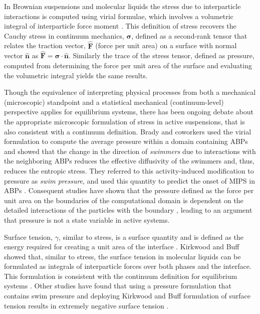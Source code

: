\documentclass[twoside,twocolumn,9pt]{article}
\begin{document}
In Brownian suspensions and molecular liquids
the stress due to interparticle interactions is computed using virial formulae, which involves a volumetric integral of interparticle force moment \cite{Kirkwood1946, Irving1950}. 
This definition of stress recovers 
the Cauchy stress in continuum mechanics,
$\mathbf{\sigma}$, defined 
as a second-rank tensor that relates the 
traction vector, $\hat{\mathbf{F}}$ (force per unit area) on a surface 
with normal vector $\hat{\mathbf{n}}$ as
$\hat{\mathbf{F}}=\mathbf{\sigma}\cdot \hat{\mathbf{n}}$. Similarly the trace of the stress
tensor, defined as pressure, computed from 
determining the force per unit area of the surface 
and evaluating the volumetric integral yields the same results. 

Though the equivalence of interpreting physical processes from both a mechanical (microscopic) standpoint and a statistical mechanical (continuum-level) perspective applies for equilibrium systems, there has been ongoing debate 
about the appropriate microscopic formulation of stress in active suspensions, that is also consistent with a continuum definition. 
Brady and coworkers used the virial 
formulation to compute the average pressure
within a domain containing ABPs and showed that
the change in the direction of \emph{swimmers} due to interactions with the neighboring ABPs 
reduces the effective diffusivity of the swimmers and, thus, reduces the entropic stress. They referred to this activity-induced modification to pressure as \emph{swim pressure}, and used this quantity to predict the onset of MIPS in ABPs \cite{Takatori2015}. Consequent studies have shown that 
the pressure defined as the force per unit area on the boundaries of the computational domain is dependent on the detailed interactions of the particles with the boundary \cite{Solon2015a, Speck2016a}, leading to an argument that pressure is not a state variable in active systems. 

Surface tension, $\gamma$, similar to stress, is a
surface quantity and is defined as the energy required for creating a unit area of the interface \cite{Navascues1979}. Kirkwood and Buff \cite{Kirkwood1949} showed that, similar to stress, the surface tension in molecular liquids can be formulated as integrals
of interparticle forces over both phases 
and the interface. This formulation is consistent with the continuum  definition for equilibrium systems \cite{Brackbill1992}. 
Other studies have found that using a pressure 
formulation that contains swim pressure and
deploying Kirkwood and Buff formulation of surface tension results in extremely negative surface tension \cite{Bialke2015a, MariniBettoloMarconi2015, Paliwal2017, Patch2018, Solon2018b}. 
\end{document}
